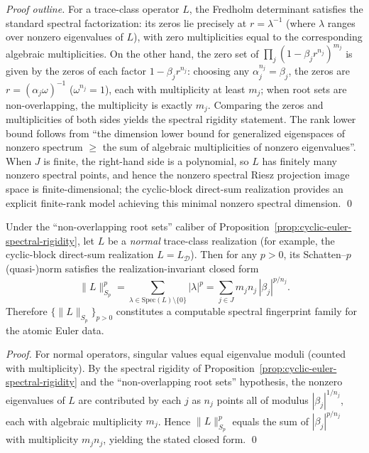 \begin{proof}[Proof outline]
For a trace-class operator \(L\), the Fredholm determinant satisfies the standard spectral factorization: its zeros lie precisely at \(r=\lambda^{-1}\) (where \(\lambda\) ranges over nonzero eigenvalues of \(L\)), with zero multiplicities equal to the corresponding algebraic multiplicities.
On the other hand, the zero set of
\(
\prod_{j}(1-\beta_j r^{n_j})^{m_j}
\)
is given by the zeros of each factor \(1-\beta_j r^{n_j}\): choosing any \(\alpha_j^{n_j}=\beta_j\), the zeros are \(r=(\alpha_j\omega)^{-1}\) (\(\omega^{n_j}=1\)), each with multiplicity at least \(m_j\); when root sets are non-overlapping, the multiplicity is exactly \(m_j\).
Comparing the zeros and multiplicities of both sides yields the spectral rigidity statement.
The rank lower bound follows from ``the dimension lower bound for generalized eigenspaces of nonzero spectrum \(\ge\) the sum of algebraic multiplicities of nonzero eigenvalues''.
When \(J\) is finite, the right-hand side is a polynomial, so \(L\) has finitely many nonzero spectral points, and hence the nonzero spectral Riesz projection image space is finite-dimensional;
the cyclic-block direct-sum realization provides an explicit finite-rank model achieving this minimal nonzero spectral dimension. \qed
\end{proof}

\begin{corollary}\label{cor:cyclic-euler-schatten-invariants}
Under the ``non-overlapping root sets'' caliber of Proposition~\ref{prop:cyclic-euler-spectral-rigidity}, let \(L\) be a \emph{normal} trace-class realization (for example, the cyclic-block direct-sum realization \(L=L_{\mathcal D}\)).
Then for any \(p>0\), its Schatten--\(p\) (quasi-)norm satisfies the realization-invariant closed form
\[
\|L\|_{S_p}^{p}
=\sum_{\lambda\in\mathrm{Spec}(L)\setminus\{0\}}|\lambda|^{p}
=\sum_{j\in J} m_j n_j\,|\beta_j|^{p/n_j}.
\]
Therefore \(\{\|L\|_{S_p}\}_{p>0}\) constitutes a computable spectral fingerprint family for the atomic Euler data.
\end{corollary}

\begin{proof}
For normal operators, singular values equal eigenvalue moduli (counted with multiplicity).
By the spectral rigidity of Proposition~\ref{prop:cyclic-euler-spectral-rigidity} and the ``non-overlapping root sets'' hypothesis, the nonzero eigenvalues of \(L\) are contributed by each \(j\) as \(n_j\) points all of modulus \(|\beta_j|^{1/n_j}\), each with algebraic multiplicity \(m_j\).
Hence \(\|L\|_{S_p}^p\) equals the sum of \(|\beta_j|^{p/n_j}\) with multiplicity \(m_jn_j\), yielding the stated closed form. \qed
\end{proof}


